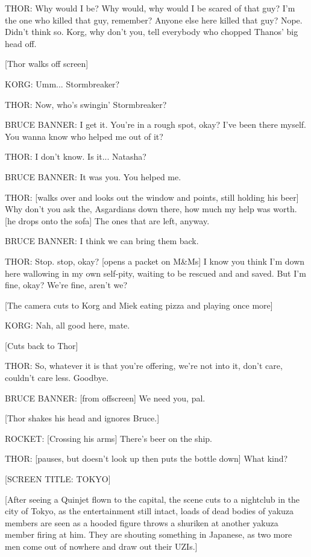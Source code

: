 THOR: Why would I be? Why would, why would I be scared of that guy? I'm the one who killed that guy, remember? Anyone else here killed that guy? Nope. Didn't think so. Korg, why don't you, tell everybody who chopped Thanos' big head off.

[Thor walks off screen]

KORG: Umm... Stormbreaker?

THOR: Now, who's swingin' Stormbreaker?

BRUCE BANNER: I get it. You're in a rough spot, okay? I've been there myself. You wanna know who helped me out of it?

THOR: I don't know. Is it... Natasha?

BRUCE BANNER: It was you. You helped me.

THOR: [walks over and looks out the window and points, still holding his beer] Why don't you ask the, Asgardians down there, how much my help was worth. [he drops onto the sofa] The ones that are left, anyway.

BRUCE BANNER: I think we can bring them back.

THOR: Stop. stop, okay? [opens a packet on M&Ms] I know you think I'm down here wallowing in my own self-pity, waiting to be rescued and and saved. But I'm fine, okay? We're fine, aren't we?

[The camera cuts to Korg and Miek eating pizza and playing once more]

KORG: Nah, all good here, mate.

[Cuts back to Thor]

THOR: So, whatever it is that you're offering, we're not into it, don't care, couldn't care less. Goodbye.

BRUCE BANNER: [from offscreen] We need you, pal.

[Thor shakes his head and ignores Bruce.]

ROCKET: [Crossing his arms] There's beer on the ship.

THOR: [pauses, but doesn't look up then puts the bottle down] What kind?

[SCREEN TITLE: TOKYO]

[After seeing a Quinjet flown to the capital, the scene cuts to a nightclub in the city of Tokyo, as the entertainment still intact, loads of dead bodies of yakuza members are seen as a hooded figure throws a shuriken at another yakuza member firing at him. They are shouting something in Japanese, as two more men come out of nowhere and draw out their UZIs.]

